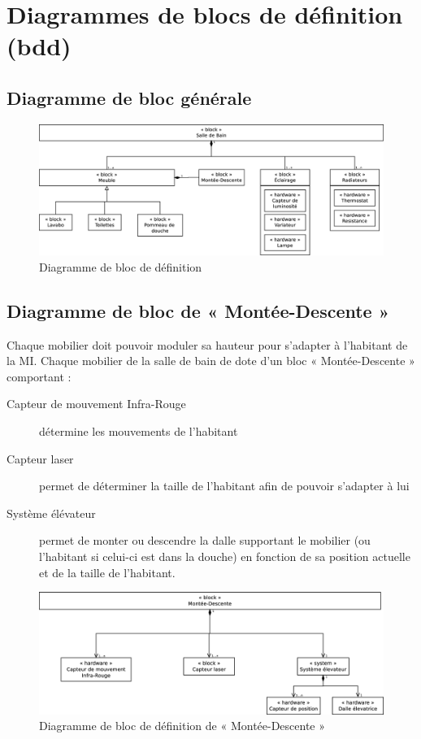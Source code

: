 \chapter{Diagrammes de blocs de définition (bdd)}
\section{Diagramme de bloc générale}
\begin{figure}
	\centering
	\includegraphics[width=1\linewidth]{diagrams/bathroom/diagramme_blocks_bdd.eps}
	\caption{Diagramme de bloc de définition}
	\label{fig:diagramme_bdd}
\end{figure}

\section{Diagramme de bloc de « Montée-Descente »}
Chaque mobilier doit pouvoir moduler sa hauteur pour s'adapter à l'habitant de la MI. Chaque mobilier de la salle de bain de dote d'un bloc « Montée-Descente » comportant :
\begin{description}
	\item[Capteur de mouvement Infra-Rouge] détermine les mouvements de l'habitant
	\item[Capteur laser] permet de déterminer la taille de l'habitant afin de pouvoir s'adapter à lui
	\item[Système élévateur] permet de monter ou descendre la dalle supportant le mobilier (ou l'habitant si celui-ci est dans la douche) en fonction de sa position actuelle et de la taille de l'habitant.   
\end{description}

\begin{figure}
	\centering
	\includegraphics[width=1\linewidth]{diagrams/bathroom/diagramme_blocks_bdd2.eps}
	\caption{Diagramme de bloc de définition de « Montée-Descente »}
	\label{fig:diagramme_bdd2}
\end{figure}